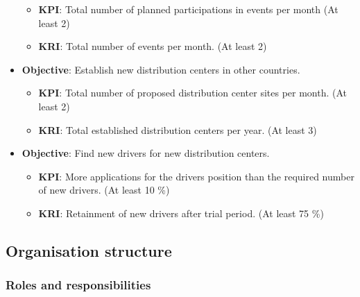 \documentclass[11pt,a4paper]{article}
\begin{document}
\begin{itemize}
    \begin{itemize}
        \item \textbf{KPI}: Total number of planned participations in events per month (At least 2)
        \item \textbf{KRI}: Total number of events per month. (At least 2)
    \end{itemize}
    \item \textbf{Objective}: Establish new distribution centers in other countries.
    \begin{itemize}
        \item \textbf{KPI}: Total number of proposed distribution center sites per month. (At least 2)
        \item \textbf{KRI}: Total established distribution centers per year. (At least 3)
    \end{itemize}
    \item \textbf{Objective}: Find new drivers for new distribution centers.
    \begin{itemize}
        \item \textbf{KPI}: More applications for the drivers position than the required number of new drivers. (At least 10 \%)
        \item \textbf{KRI}: Retainment of new drivers after trial period. (At least 75 \%)
    \end{itemize}
\end{itemize}


\subsection{Organisation structure}
\subsubsection{Roles and responsibilities}
\end{document}
